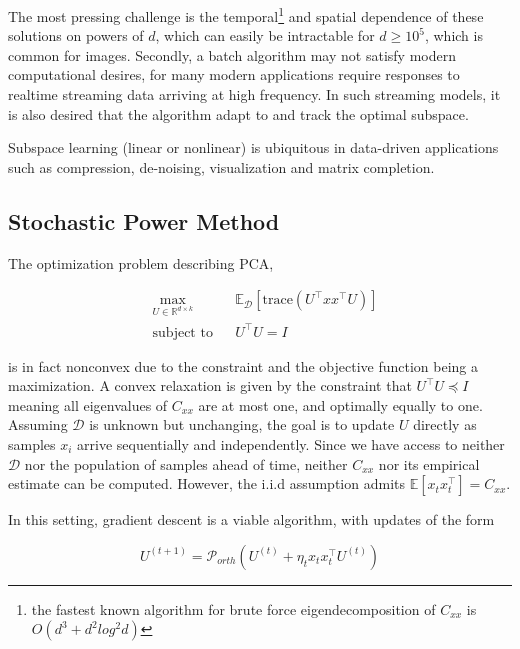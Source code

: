\documentclass[11pt,letterpaper]{article}
\begin{document}
The most pressing challenge is the temporal\footnote{the fastest known algorithm for brute force eigendecomposition of $C_{xx}$ is $O(d^3+d^2log^2d)$} and spatial dependence of these solutions on powers of $d$, which can easily be intractable for $d \geq10^5$, which is common for images. Secondly, a batch algorithm may not satisfy modern computational desires, for many modern applications require responses to realtime streaming data arriving at high frequency. In such streaming models, it is also desired that the algorithm adapt to and track the optimal subspace.

Subspace learning (linear or nonlinear) is ubiquitous in data-driven applications such as compression, de-noising, visualization and matrix completion. 



\subsection{Stochastic Power Method}

The optimization problem describing PCA,  

\begin{equation}
\begin{aligned}
& \underset{U \in \mathbb{R}^{d \times k}}{\text{max}}
& & \mathbb{E}_{\mathcal{D}}\left[\text{trace}\left(U^{\top}xx^{\top}U\right)\right] \\
& \text{subject to}
& & U^{\top}U = I
\end{aligned}
\end{equation}

is in fact nonconvex due to the constraint and the objective function being a maximization. A convex relaxation is given by the constraint that $U^{\top}U \preceq I$ meaning all eigenvalues of $C_{xx}$ are at most one, and optimally equally to one. Assuming $\mathcal{D}$ is unknown but unchanging, the goal is to update $U$ directly as samples $x_i$ arrive sequentially and independently. Since we have access to neither $\mathcal{D}$ nor the population of samples ahead of time, neither $C_{xx}$ nor its empirical estimate can be computed. However, the i.i.d assumption admits $\mathbb{E}[ x_t x_t^{\top}] = C_{xx}$.

In this setting, gradient descent is a viable algorithm, with updates of the form 

\begin{equation}
U^{(t + 1)} = \mathcal{P}_{orth} \left( U^{(t)} + \eta_t x_t x_t^{\top}U^{(t)} \right)
\end{equation}
\end{document}
